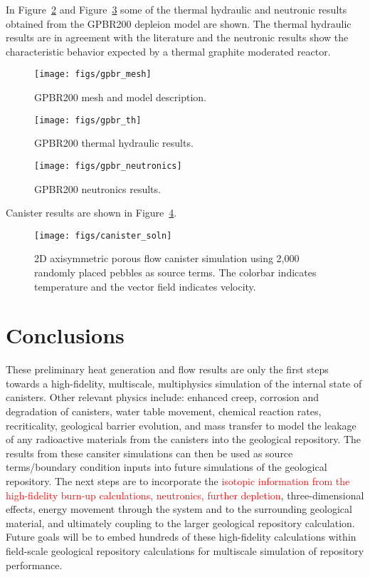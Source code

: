 \documentclass{anstrans}
\newcommand{\red}[1]{\textcolor{red}{#1}}
\begin{document}
In Figure~\ref{fig:gpbr_th} and Figure~\ref{fig:gpbr_neutronics} some of the thermal hydraulic and neutronic results obtained from the GPBR200 depleion model are shown.
The thermal hydraulic results are in agreement with the literature and the neutronic results show the characteristic behavior expected by a thermal graphite moderated reactor.
\begin{figure}[ht] %
  \centering
  \texttt{[image: figs/gpbr\_mesh]}
  \caption{GPBR200 mesh and model description.}
  \label{fig:gpbr_mesh}
\end{figure}
\begin{figure}[ht] %
  \centering
  \texttt{[image: figs/gpbr\_th]}
  \caption{GPBR200 thermal hydraulic results.}
  \label{fig:gpbr_th}
\end{figure}
\begin{figure}[ht] %
  \centering
  \texttt{[image: figs/gpbr\_neutronics]}
  \caption{GPBR200 neutronics results.}
  \label{fig:gpbr_neutronics}
\end{figure}

Canister results are shown in Figure~\ref{fig:canister_soln}.
\begin{figure}[ht] %
  \centering
  \texttt{[image: figs/canister\_soln]}
  \caption{2D axisymmetric porous flow canister simulation using 2,000 randomly placed pebbles as source terms.
The colorbar indicates temperature and the vector field indicates velocity.}
  \label{fig:canister_soln}
\end{figure}

\section{Conclusions}

These preliminary heat generation and flow results are only the first steps towards a high-fidelity, multiscale, multiphysics simulation of the internal state of canisters.
Other relevant physics include: enhanced creep, corrosion and degradation of canisters, water table movement, chemical reaction rates, recriticality, geological barrier evolution, and mass transfer to model the leakage of any radioactive materials from the canisters into the geological repository.
The results from these cansiter simulations can then be used as source terms/boundary condition inputs into future simulations of the geological repository.
The next steps are to incorporate the \red{isotopic information from the high-fidelity burn-up calculations, neutronics, further depletion}, three-dimensional effects, energy movement through the system and to the surrounding geological material, and ultimately coupling to the larger geological repository calculation.
Future goals will be to embed hundreds of these high-fidelity calculations within field-scale geological repository calculations for multiscale simulation of repository performance. 
\end{document}

